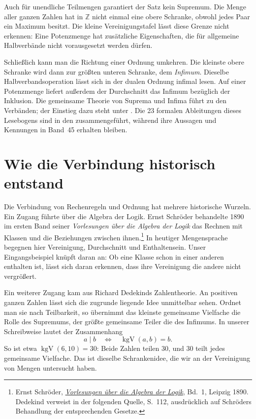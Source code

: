 Auch für unendliche Teilmengen garantiert der Satz kein Supremum.
Die Menge aller ganzen Zahlen hat in \(\mathbb Z\) nicht einmal
eine obere Schranke, obwohl jedes Paar ein Maximum besitzt.
Die kleine Vereinigungstafel lässt diese Grenze nicht erkennen:
Eine Potenzmenge hat zusätzliche Eigenschaften, die für allgemeine
Halbverbände nicht vorausgesetzt werden dürfen.

Schließlich kann man die Richtung einer Ordnung umkehren.
Die kleinste obere Schranke wird dann zur größten unteren Schranke,
dem \emph{Infimum}. Dieselbe Halbverbandsoperation lässt sich
in der dualen Ordnung infimal lesen. Auf einer Potenzmenge liefert
außerdem der Durchschnitt das Infimum bezüglich der Inklusion.
Die gemeinsame Theorie von Suprema und Infima führt zu den
Verbänden; der Einstieg dazu steht unter \SemilatticeMainLink{}.
Die 23 formalen Ableitungen dieses Lesebogens sind in den
\SemilatticeProofsLink{} zusammengeführt, während ihre Aussagen
und Kennungen in Band~45 erhalten bleiben.

\clearpage
\section*{Wie die Verbindung historisch entstand}
\hypertarget{semilattice.reading.history}{}

Die Verbindung von Rechenregeln und Ordnung hat mehrere historische
Wurzeln. Ein Zugang führte über die Algebra der Logik. Ernst Schröder
behandelte 1890 im ersten Band seiner \emph{Vorlesungen über die
Algebra der Logik} das Rechnen mit Klassen und die Beziehungen
zwischen ihnen.\footnote{Ernst Schröder,
\href{https://www.deutschestextarchiv.de/book/show/schroeder_logik01_1890}{\emph{Vorlesungen über die Algebra der Logik}},
Bd.~1, Leipzig 1890. Dedekind verweist in der folgenden Quelle,
S.~112, ausdrücklich auf Schröders Behandlung der entsprechenden Gesetze.}
In heutiger Mengensprache begegnen hier Vereinigung, Durchschnitt
und Enthaltensein. Unser Eingangsbeispiel knüpft daran an:
Ob eine Klasse schon in einer anderen enthalten ist, lässt sich
daran erkennen, dass ihre Vereinigung die andere nicht vergrößert.

Ein weiterer Zugang kam aus Richard Dedekinds Zahlentheorie.
An positiven ganzen Zahlen lässt sich die zugrunde liegende
Idee unmittelbar sehen. Ordnet man sie nach Teilbarkeit, so
übernimmt das kleinste gemeinsame Vielfache die Rolle des
Supremums, der größte gemeinsame Teiler die des Infimums.
In unserer Schreibweise lautet der Zusammenhang
\[
  a\mid b\quad\Longleftrightarrow\quad
  \operatorname{kgV}(a,b)=b.
\]
So ist etwa \(\operatorname{kgV}(6,10)=30\): Beide Zahlen
teilen \(30\), und \(30\) teilt jedes gemeinsame Vielfache.
Das ist dieselbe Schrankenidee, die wir an der Vereinigung
von Mengen untersucht haben.

